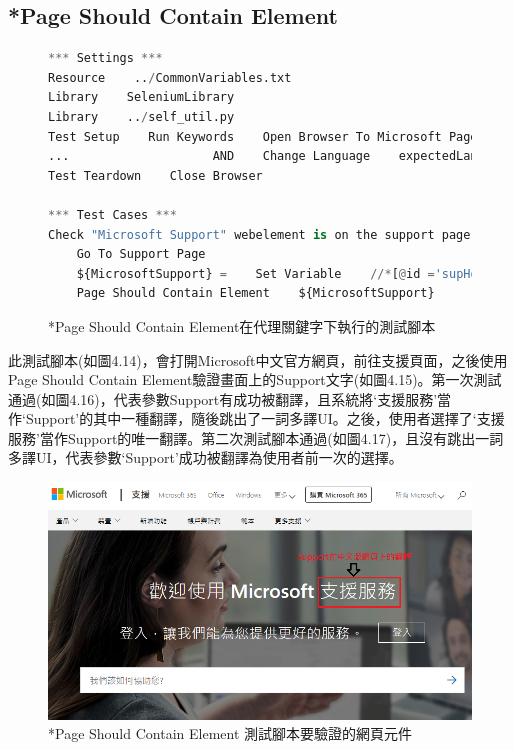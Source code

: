\subsection{*Page Should Contain Element}
\begin{figure}[H]
\begin{lstlisting}[language={python}]
*** Settings ***
Resource    ../CommonVariables.txt
Library    SeleniumLibrary
Library    ../self_util.py
Test Setup    Run Keywords    Open Browser To Microsoft Page
...                    AND    Change Language    expectedLanguage=${language}
Test Teardown    Close Browser

*** Test Cases ***
Check "Microsoft Support" webelement is on the support page
    Go To Support Page
    ${MicrosoftSupport} =    Set Variable    //*[@id ='supHomeAndLandingPageHeaderContainer']//*[contains(text(), 'Support')]
    Page Should Contain Element    ${MicrosoftSupport}
\end{lstlisting}
\caption{*Page Should Contain Element在代理關鍵字下執行的測試腳本}
\end{figure}
此測試腳本(如圖4.14)，會打開Microsoft中文官方網頁，前往支援頁面，之後使用Page Should Contain Element驗證畫面上的Support文字(如圖4.15)。第一次測試通過(如圖4.16)，代表參數Support有成功被翻譯，且系統將‘支援服務’當作‘Support’的其中一種翻譯，隨後跳出了一詞多譯UI。之後，使用者選擇了‘支援服務’當作Support的唯一翻譯。第二次測試腳本通過(如圖4.17)，且沒有跳出一詞多譯UI，代表參數‘Support’成功被翻譯為使用者前一次的選擇。

\begin{figure}[H]
\centering
\includegraphics[width= .8\textwidth]{../論文截圖/4-1-9 Page should contain element要驗證的網頁元件.png}
\caption{*Page Should Contain Element 測試腳本要驗證的網頁元件}
\end{figure}

